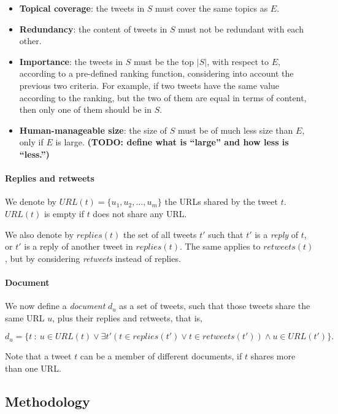 \documentclass[12pt]{article}
\begin{document}
\begin{itemize}
  \item {\bf Topical coverage}: the tweets in $S$ must cover the same
    topics as $E$.
    
  \item {\bf Redundancy}: the content of tweets in $S$ must not be
    redundant with each other.
    
  \item {\bf Importance}: the tweets in $S$ must be the top $|S|$,
    with respect to $E$, according to a pre-defined ranking function,
    considering into account the previous two criteria. For example,
    if two tweets have the same value according to the ranking, but
    the two of them are equal in terms of content, then only one of
    them should be in $S$.

  \item {\bf Human-manageable size}: the size of $S$ must be of much
    less size than $E$, only if $E$ is large. {\bf (TODO: define what
    is ``large'' and how less is ``less.'')}
\end{itemize}


\paragraph{Replies and retweets}
We denote by $\mathit{URL}(t) = \{u_1, u_2, \ldots, u_m\}$ the URLs
shared by the tweet $t$. $\mathit{URL}(t)$ is empty if $t$ does not
share any URL.

We also denote by $\mathit{replies}(t)$ the set of all tweets $t'$
such that $t'$ is a {\em reply} of $t$, or $t'$ is a reply of another tweet
in $\mathit{replies}(t)$. The same applies to $\mathit{retweets}(t)$,
but by considering {\em retweets} instead of replies.

\paragraph{Document}
We now define a {\em document} $d_u$ as a set of tweets, such that
those tweets share the same URL $u$, plus their replies and retweets,
that is,

$$d_u = \{t\ :\ u \in \mathit{URL}(t) \lor \exists t'
(t \in \mathit{replies}(t') \lor t \in \mathit{retweets}(t')) \land
u \in \mathit{URL}(t')\}.$$

Note that a tweet $t$ can be a member of different documents, if $t$
shares more than one URL.


\subsection{Methodology}
\end{document}

